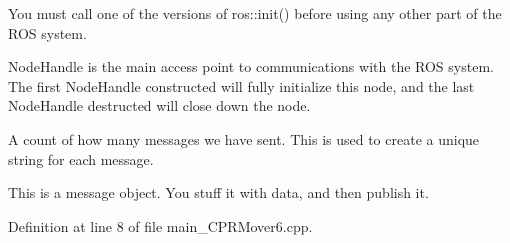 You must call one of the versions of ros\+::init() before using any other part of the R\+OS system.

Node\+Handle is the main access point to communications with the R\+OS system. The first Node\+Handle constructed will fully initialize this node, and the last Node\+Handle destructed will close down the node.

A count of how many messages we have sent. This is used to create a unique string for each message.

This is a message object. You stuff it with data, and then publish it.

Definition at line 8 of file main\+\_\+\+C\+P\+R\+Mover6.\+cpp.

